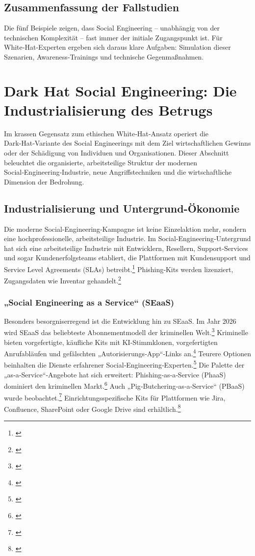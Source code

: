 \documentclass[10pt,a4paper]{article}
\begin{document}
	\subsection{Zusammenfassung der Fallstudien}
	Die fünf Beispiele zeigen, dass Social Engineering – unabhängig von der technischen Komplexität – fast immer der initiale Zugangspunkt ist. Für White‑Hat‑Experten ergeben sich daraus klare Aufgaben: Simulation dieser Szenarien, Awareness‑Trainings und technische Gegenmaßnahmen.
	
	\section{Dark Hat Social Engineering: Die Industrialisierung des Betrugs}
	Im krassen Gegensatz zum ethischen White‑Hat‑Ansatz operiert die Dark‑Hat‑Variante des Social Engineerings mit dem Ziel wirtschaftlichen Gewinns oder der Schädigung von Individuen und Organisationen. Dieser Abschnitt beleuchtet die organisierte, arbeitsteilige Struktur der modernen Social‑Engineering‑Industrie, neue Angriffstechniken und die wirtschaftliche Dimension der Bedrohung.
	
	\subsection{Industrialisierung und Untergrund-Ökonomie}
	Die moderne Social‑Engineering‑Kampagne ist keine Einzelaktion mehr, sondern eine hochprofessionelle, arbeitsteilige Industrie. Im Social‑Engineering‑Untergrund hat sich eine arbeitsteilige Industrie mit Entwicklern, Resellern, Support‑Services und sogar Kundenerfolgsteams etabliert, die Plattformen mit Kundensupport und Service Level Agreements (SLAs) betreibt.\footnote{\cite{ZeroFoxUnderground}} Phishing‑Kits werden lizenziert, Zugangsdaten wie Inventar gehandelt.\footnote{\cite{ZeroFoxUnderground}}
	
	\subsubsection{„Social Engineering as a Service“ (SEaaS)}
	Besonders besorgniserregend ist die Entwicklung hin zu SEaaS. Im Jahr 2026 wird SEaaS das beliebteste Abonnementmodell der kriminellen Welt.\footnote{\cite{ForescoutPredictions}} Kriminelle bieten vorgefertigte, käufliche Kits mit KI‑Stimmklonen, vorgefertigten Anrufabläufen und gefälschten „Autorisierungs‑App“‑Links an.\footnote{\cite{ForescoutPredictions}} Teurere Optionen beinhalten die Dienste erfahrener Social‑Engineering‑Experten.\footnote{\cite{ForescoutPredictions}} Die Palette der „as‑a‑Service“‑Angebote hat sich erweitert: Phishing‑as‑a‑Service (PhaaS) dominiert den kriminellen Markt.\footnote{\cite{FlarePhaaS}} Auch „Pig‑Butchering‑as‑a‑Service“ (PBaaS) wurde beobachtet.\footnote{\cite{PBaaS}} Einrichtungsspezifische Kits für Plattformen wie Jira, Confluence, SharePoint oder Google Drive sind erhältlich.\footnote{\cite{PhaasKits}}
	
\end{document}
